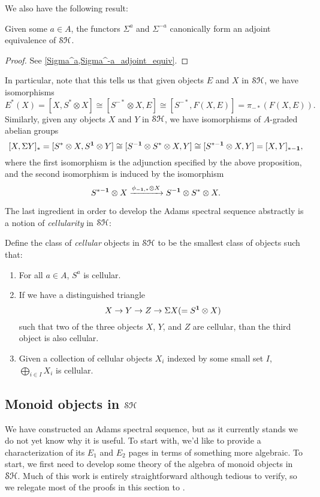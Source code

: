 \documentclass[../main.tex]{subfiles}
\begin{document}
We also have the following result:

\begin{proposition}
	Given some $a\in A$, the functors $\Sigma^a$ and $\Sigma^{-a}$ canonically form an adjoint equivalence of $\mathcal{SH}$.
\end{proposition}
\begin{proof}
	See \autoref{Sigma^a,Sigma^-a_adjoint_equiv}.
\end{proof}

In particular, note that this tells us that given objects $E$ and $X$ in $\mathcal{SH}$, we have isomorphisms
\[E^\ast(X)=[X,S^*\otimes X]\cong[S^{-\ast}\otimes X,E]\cong[S^{-*},F(X,E)]=\pi_{-*}(F(X,E)).\]
Similarly, given any objects $X$ and $Y$ in $\mathcal{SH}$, we have isomorphisms of $A$-graded abelian groups
\[[X,\Sigma Y]_*=[S^*\otimes X,S^{\mathbf{1}}\otimes Y]\cong[S^{-\mathbf{1}}\otimes S^\ast\otimes X,Y]\cong[S^{*-\mathbf{1}}\otimes X,Y]=[X,Y]_{*-\mathbf{1}},\]
where the first isomorphism is the adjunction specified by the above proposition, and the second isomorphism is induced by the isomorphism
\[S^{*-\mathbf{1}}\otimes X\xrightarrow{\phi_{-\mathbf{1},\ast}\otimes X}S^{-\mathbf{1}}\otimes S^*\otimes X.\]

The last ingredient in order to develop the Adams spectral sequence abstractly is a notion of \emph{cellularity} in $\mathcal{SH}$:

\begin{definition}\label{cellular}
	Define the class of \emph{cellular} objects in $\mathcal{SH}$ to be the smallest class of objects such that:
	\begin{enumerate}
		\item For all $a\in A$, $S^a$ is cellular.
		\item If we have a distinguished triangle
		\[X\to Y\to Z\to\Sigma X(=S^{\mathbf{1}}\otimes X)\]
		such that two of the three objects $X$, $Y$, and $Z$ are cellular, than the third object is also cellular.
		\item Given a collection of cellular objects $X_i$ indexed by some small set $I$, $\bigoplus_{i\in I} X_i$ is cellular.
	\end{enumerate}
\end{definition}

\subsection{Monoid objects in \texorpdfstring{$\mathcal{SH}$}{TEXT}}

We have constructed an Adams spectral sequence, but as it currently stands we do not yet know why it is useful. To start with, we'd like to provide a characterization of its $E_1$ and $E_2$ pages in terms of something more algebraic. To start, we first need to develop some theory of the algebra of monoid objects in $\mathcal{SH}$. Much of this work is entirely straightforward although tedious to verify, so we relegate most of the proofs in this section to .
\end{document}
